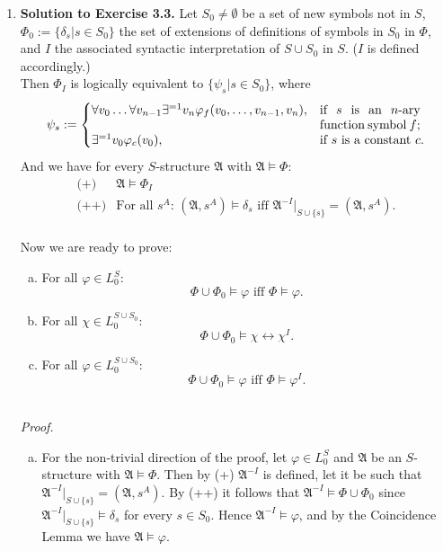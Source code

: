 \begin{enumerate}[1.]
%
\item \textbf{Solution to Exercise 3.3.} Let $S_0 \neq \emptyset$ be a set of new symbols not in $S$, $\Phi_0 := \{ \delta_s | s \in S_0 \}$ the set of extensions of definitions of symbols in $S_0$ in $\Phi$, and $I$ the associated syntactic interpretation of $S \cup S_0$ in $S$. ($I$ is defined accordingly.)\\
Then $\Phi_I$ is logically equivalent to $\{ \psi_s | s \in S_0 \}$, where
\[
\psi_s := \begin{cases}
\forall v_0 \ldots \forall v_{n-1} \exists^{=1}v_n \varphi_f(v_0, \ldots, v_{n-1}, v_n), & \begin{minipage}[t]{8em}if \(s\) is an \(n\)-ary function symbol \(f\);\end{minipage} \cr
\exists^{=1}v_0 \varphi_c(v_0), & \mbox{if \(s\) is a constant \(c\)}.
\end{cases}
\]
And we have for every $S$-structure $\mathfrak{A}$ with $\mathfrak{A} \models \Phi$:
\[
\begin{array}{ll}
\mbox{(+)} & \mathfrak{A} \models \Phi_I \\
\mbox{(++)}& \mbox{For all $s^A$: $(\mathfrak{A}, s^A) \models \delta_s$ iff $\mathfrak{A}^{-I}|_{S \cup \{ s \}} = (\mathfrak{A}, s^A)$.}
\end{array}
\]
\\
Now we are ready to prove:
\begin{enumerate}[(a)]
\item For all $\varphi \in L^S_0$:
\[
\mbox{$\Phi \cup \Phi_0 \models \varphi$ iff $\Phi \models \varphi$}.
\]
\item For all $\chi \in L_0^{S \cup S_0}$:
\[
\Phi \cup \Phi_0 \models \chi \leftrightarrow \chi^I.
\]
\item For all $\varphi \in L_0^{S \cup S_0}$:
\[
\mbox{$\Phi \cup \Phi_0 \models \varphi$ iff $\Phi \models \varphi^I$}.
\]
\end{enumerate}
\ 
\\
\textit{Proof.}
\begin{enumerate}[(a)]
\item For the non-trivial direction of the proof, let $\varphi \in L^S_0$ and $\mathfrak{A}$ be an $S$-structure with $\mathfrak{A} \models \Phi$. Then by (+) $\mathfrak{A}^{-I}$ is defined, let it be such that $\mathfrak{A}^{-I}|_{S \cup \{ s \}} = (\mathfrak{A}, s^A)$. By (++) it follows that $\mathfrak{A}^{-I} \models \Phi \cup \Phi_0$ since $\mathfrak{A}^{-I}|_{S \cup \{ s \}} \models \delta_s$ for every $s \in S_0$. Hence $\mathfrak{A}^{-I} \models \varphi$, and by the Coincidence Lemma we have $\mathfrak{A} \models \varphi$.

\end{enumerate}
\end{enumerate}

